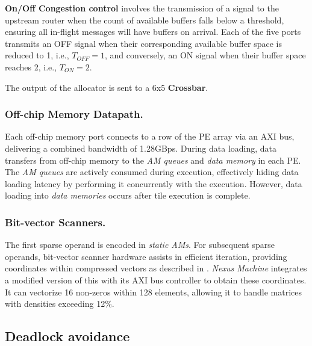 \textbf{On/Off Congestion control} involves the transmission of a signal to the upstream router when the count of available buffers falls below a threshold, ensuring all in-flight messages will have buffers on arrival. Each of the five ports transmits an OFF signal when their corresponding available buffer space is reduced to 1, i.e., $T_{OFF} = 1$, and conversely, an ON signal when their buffer space reaches 2, i.e., $T_{ON} = 2$.

The output of the allocator is sent to a 6x5 \textbf{Crossbar}.

\subsubsection{Off-chip Memory Datapath.}
Each off-chip memory port connects to a row of the PE array via an AXI bus, delivering a combined bandwidth of 1.28GBps. During data loading, data transfers from off-chip memory to the \textit{AM queues} and \textit{data memory} in each PE. 
The \textit{AM queues} are actively consumed during execution, effectively hiding data loading latency by performing it concurrently with the execution. 
However, data loading into \textit{data memories} occurs after tile execution is complete.

\subsubsection{Bit-vector Scanners.}
The first sparse operand is encoded in \textit{static AMs}. For subsequent sparse operands, bit-vector scanner hardware assists in efficient iteration, providing coordinates within compressed vectors as described in \cite{capstan}. \textit{Nexus Machine} integrates a modified version of this with its AXI bus controller to obtain these coordinates. It can vectorize 16 non-zeros within 128 elements, allowing it to handle matrices with densities exceeding 12\%.
\vspace{-0.2cm}
\subsection{Deadlock avoidance}

